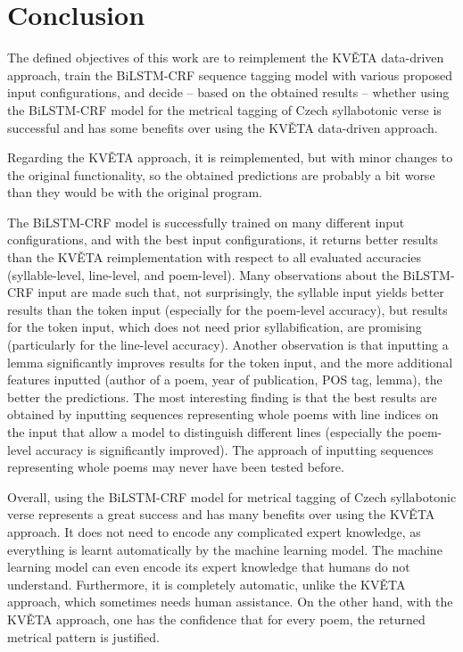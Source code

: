 \chapter*{Conclusion}

The defined objectives of this work are to reimplement the KVĚTA data-driven approach, train the BiLSTM-CRF sequence tagging model with various proposed input configurations, and decide -- based on the obtained results -- whether using the BiLSTM-CRF model for the metrical tagging of Czech syllabotonic verse is successful and has some benefits over using the KVĚTA data-driven approach.

Regarding the KVĚTA approach, it is reimplemented, but with minor changes to the original functionality, so the obtained predictions are probably a bit worse than they would be with the original program.

The BiLSTM-CRF model is successfully trained on many different input configurations, and with the best input configurations, it returns better results than the KVĚTA reimplementation with respect to all evaluated accuracies (syllable-level, line-level, and poem-level). Many observations about the BiLSTM-CRF input are made such that, not surprisingly, the syllable input yields better results than the token input (especially for the poem-level accuracy), but results for the token input, which does not need prior syllabification, are promising (particularly for the line-level accuracy). Another observation is that inputting a lemma significantly improves results for the token input, and the more additional features inputted (author of a poem, year of publication, POS tag, lemma), the better the predictions. The most interesting finding is that the best results are obtained by inputting sequences representing whole poems with line indices on the input that allow a model to distinguish different lines (especially the poem-level accuracy is significantly improved). The approach of inputting sequences representing whole poems may never have been tested before.

Overall, using the BiLSTM-CRF model for metrical tagging of Czech syllabotonic verse represents a great success and has many benefits over using the KVĚTA approach. It does not need to encode any complicated expert knowledge, as everything is learnt automatically by the machine learning model. The machine learning model can even encode its expert knowledge that humans do not understand. Furthermore, it is completely automatic, unlike the KVĚTA approach, which sometimes needs human assistance. On the other hand, with the KVĚTA approach, one has the confidence that for every poem, the returned metrical pattern is justified.

